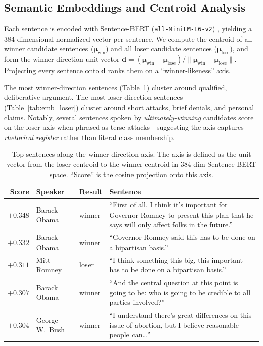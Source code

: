 \documentclass[journal]{IEEEtran}
\begin{document}
\subsection{Semantic Embeddings and Centroid Analysis}
Each sentence is encoded with Sentence-BERT (\texttt{all-MiniLM-L6-v2})
\cite{reimers2019sbert}, yielding a $384$-dimensional normalized
vector per sentence. We compute the centroid of all winner candidate
sentences ($\boldsymbol{\mu}_{\text{win}}$) and all loser candidate
sentences ($\boldsymbol{\mu}_{\text{lose}}$), and form the
winner-direction unit vector
$\mathbf{d} = (\boldsymbol{\mu}_{\text{win}} - \boldsymbol{\mu}_{\text{lose}})
/ \lVert \boldsymbol{\mu}_{\text{win}} - \boldsymbol{\mu}_{\text{lose}} \rVert$.
Projecting every sentence onto $\mathbf{d}$ ranks them on a
``winner-likeness'' axis.

The most winner-direction sentences (Table~\ref{tab:emb_winner})
cluster around qualified, deliberative argument. The most
loser-direction sentences (Table~\ref{tab:emb_loser}) cluster around
short attacks, brief denials, and personal claims. Notably, several
sentences spoken by \emph{ultimately-winning} candidates score on the
loser axis when phrased as terse attacks---suggesting the axis
captures \emph{rhetorical register} rather than literal class
membership.

\begin{table}[!t]
\caption{Top sentences along the winner-direction axis. The axis is
defined as the unit vector from the loser-centroid to the
winner-centroid in $384$-dim Sentence-BERT space. ``Score'' is the
cosine projection onto this axis.}
\label{tab:emb_winner}
\centering
\small
\begin{tabular}{rllp{}}
\toprule
Score & Speaker & Result & Sentence \\
\midrule
$+0.348$ & Barack Obama   & winner & ``First of all, I think it's important for Governor Romney to present this plan that he says will only affect folks in the future.'' \\
$+0.332$ & Barack Obama   & winner & ``Governor Romney said this has to be done on a bipartisan basis.'' \\
$+0.311$ & Mitt Romney    & loser  & ``I think something this big, this important has to be done on a bipartisan basis.'' \\
$+0.307$ & Barack Obama   & winner & ``And the central question at this point is going to be: who is going to be credible to all parties involved?'' \\
$+0.304$ & George W.\ Bush & winner & ``I understand there's great differences on this issue of abortion, but I believe reasonable people can\ldots'' \\
\bottomrule
\end{tabular}
\end{table}
\end{document}
